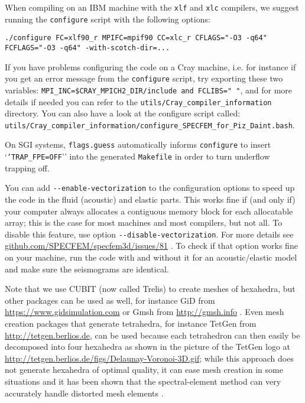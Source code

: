 When compiling on an IBM machine with the \texttt{xlf} and \texttt{xlc}
compilers, we suggest running the \texttt{configure} script with the
following options:

{\footnotesize
\begin{verbatim}
./configure FC=xlf90_r MPIFC=mpif90 CC=xlc_r CFLAGS="-O3 -q64" FCFLAGS="-O3 -q64" -with-scotch-dir=...
\end{verbatim}
}

If you have problems configuring the code on a Cray machine, i.e. for instance if you get an error message from the \texttt{configure} script, try exporting these two variables:
\texttt{MPI\_INC=\${CRAY\_MPICH2\_DIR}/include and FCLIBS=" "}, and for more details if needed you can refer to the \texttt{utils/Cray\_compiler\_information} directory.
You can also have a look at the configure script called:\newline
\texttt{utils/Cray\_compiler\_information/configure\_SPECFEM\_for\_Piz\_Daint.bash}.

On SGI systems, \texttt{flags.guess} automatically informs \texttt{configure}
to insert `\texttt{`TRAP\_FPE=OFF}'' into the generated \texttt{Makefile}
in order to turn underflow trapping off.\newline

You can add \texttt{-{}-enable-vectorization} to the configuration options to speed up the code in the fluid (acoustic) and elastic parts.
This works fine if (and only if) your computer always allocates a contiguous memory block for each allocatable array;
this is the case for most machines and most compilers, but not all. To disable this feature, use option \texttt{-{}-disable-vectorization}.
For more details see \href{https://github.com/SPECFEM/specfem3d/issues/81}{github.com/SPECFEM/specfem3d/issues/81} .
To check if that option works fine on your machine, run the code with and without it for an acoustic/elastic model and make sure the seismograms are identical.\newline


Note that we use CUBIT (now called Trelis) to create meshes of hexahedra, but other packages
can be used as well, for instance GiD from \url{https://www.gidsimulation.com}
or Gmsh from \url{http://gmsh.info} \citep{GeRe09}. Even mesh
creation packages that generate tetrahedra, for instance TetGen from
\url{http://tetgen.berlios.de}, can be used because each tetrahedron
can then easily be decomposed into four hexahedra as shown in the
picture of the TetGen logo at \url{http://tetgen.berlios.de/figs/Delaunay-Voronoi-3D.gif};
while this approach does not generate hexahedra of optimal quality,
it can ease mesh creation in some situations and it has been shown
that the spectral-element method can very accurately handle distorted
mesh elements \citep{OlSe11}.\newline

